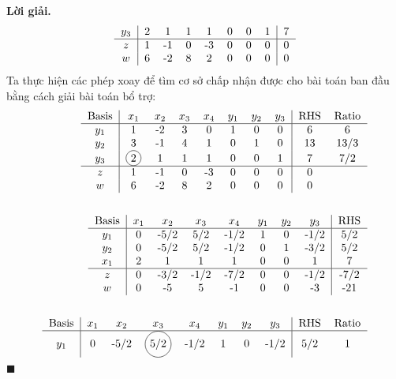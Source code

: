 \documentclass[12pt]{article}
\newcommand*\circled[1]{\tikz[baseline=(char.base)]{%
            \node[shape=circle,draw,inner sep=2pt] (char) {#1};}}
\newenvironment{solution}{%
     \setlength\parindent{0pt}\par\medskip\textbf{Lời giải.}\quad}{%
     \hfill\tiny$\blacksquare$\par\medskip}
\begin{document}
\begin{solution}
\begin{align*}
\begin{tabular}{c|ccccccc|c}
                $y_3$ & 2 & 1 & 1 & 1 & 0 & 0 & 1 & 7 \\ \hline
                $z$ & 1 & -1 & 0 & -3 & 0 & 0 & 0 & 0 \\
                $w$ & 6 & -2 & 8 & 2 & 0 & 0 & 0 & 0
            \end{tabular}
        \end{align*}
        Ta thực hiện các phép xoay để tìm cơ sở chấp nhận được cho bài toán ban đầu bằng cách giải bài toán bổ trợ:
        \begin{align*}
            \begin{tabular}{c|ccccccc|cc}
                \text{Basis} & $x_1$ & $x_2$ & $x_3$ & $x_4$ & $y_1$ & $y_2$ & $y_3$ & RHS & Ratio \\ \hline
                $y_1$ & 1 & -2 & 3 & 0 & 1 & 0 & 0 & 6 & 6\\
                $y_2$ & 3 & -1 & 4 & 1 & 0 & 1 & 0 & 13 & 13/3\\
                $y_3$ & \circled{2} & 1 & 1 & 1 & 0 & 0 & 1 & 7 & 7/2 \\ \hline
                $z$ & 1 & -1 & 0 & -3 & 0 & 0 & 0 & 0 \\
                $w$ & 6 & -2 & 8 & 2 & 0 & 0 & 0 & 0
            \end{tabular}
            \\
            \\
            \begin{tabular}{c|ccccccc|cc}
                \text{Basis} & $x_1$ & $x_2$ & $x_3$ & $x_4$ & $y_1$ & $y_2$ & $y_3$ & RHS \\ \hline
                $y_1$ & 0 & -5/2 & 5/2 & -1/2 & 1 & 0 & -1/2 & 5/2 \\
                $y_2$ & 0 & -5/2 & 5/2 & -1/2 & 0 & 1 & -3/2 & 5/2 \\
                $x_1$ & 2 & 1 & 1 & 1 & 0 & 0 & 1 & 7 \\ \hline
                $z$ & 0 & -3/2 & -1/2 & -7/2 & 0 & 0 & -1/2 & -7/2 \\
                $w$ & 0 & -5 & 5 & -1 & 0 & 0 & -3 & -21
            \end{tabular}
            \\
            \\
            \begin{tabular}{c|ccccccc|cc}
                \text{Basis} & $x_1$ & $x_2$ & $x_3$ & $x_4$ & $y_1$ & $y_2$ & $y_3$ & RHS & Ratio \\ \hline
                $y_1$ & 0 & -5/2 & \circled{5/2} & -1/2 & 1 & 0 & -1/2 & 5/2 & 1 \\

\end{tabular}
\end{align*}
\end{solution}
\end{document}
